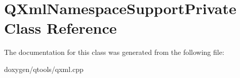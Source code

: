\hypertarget{class_q_xml_namespace_support_private}{}\section{Q\+Xml\+Namespace\+Support\+Private Class Reference}
\label{class_q_xml_namespace_support_private}


The documentation for this class was generated from the following file\+:\begin{DoxyCompactItemize}
\item 
doxygen/qtools/qxml.\+cpp\end{DoxyCompactItemize}
